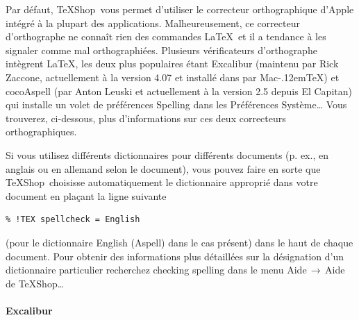 \documentclass[11pt,french]{article}
\newcommand{\MacTeX}{Mac\kern-.12em\TeX}
\newcommand{\TS}{\textsf{\TeX Shop}}
\newcommand{\cmd}[1]{\textsf{#1}}
\newcommand{\mnu}[1]{\textsf{#1}}
\newcommand{\To}{\,\(\to\)\,}
\begin{document}
Par défaut, \TS\ vous permet d'utiliser le correcteur orthographique d'Apple intégré à la plupart des applications. Malheureusement, ce correcteur d'orthographe ne connaît rien des commandes \LaTeX\ et il a tendance à les signaler comme mal orthographiées. Plusieurs vérificateurs d'orthographe intègrent \LaTeX, les deux plus populaires étant \cmd{Excalibur} (maintenu par Rick Zaccone, actuellement à la version 4.07 et installé dans  par  \MacTeX) et \cmd{cocoAspell} (par Anton Leuski et actuellement à la version 2.5 depuis \cmd{El Capitan}) qui installe un volet de préférences \cmd{Spelling} dans les \cmd{Préférences Système…} Vous trouverez, ci-dessous, plus d'informations sur ces deux correcteurs orthographiques.

Si vous utilisez différents dictionnaires pour différents documents (p. ex., en anglais ou en allemand selon le document), vous pouvez faire en sorte que \TS\ choisisse automatiquement le dictionnaire approprié dans votre document en plaçant la ligne suivante

\begin{verbatim}
% !TEX spellcheck = English
\end{verbatim}
(pour le dictionnaire \cmd{English (Aspell)} dans le cas présent) dans le haut de chaque document. Pour obtenir des informations plus détaillées sur la désignation d'un dictionnaire particulier recherchez \cmd{checking spelling} dans le menu \mnu{Aide}\To\mnu{Aide de TeXShop…}

\paragraph{\cmd{Excalibur}}

%
\end{document}
